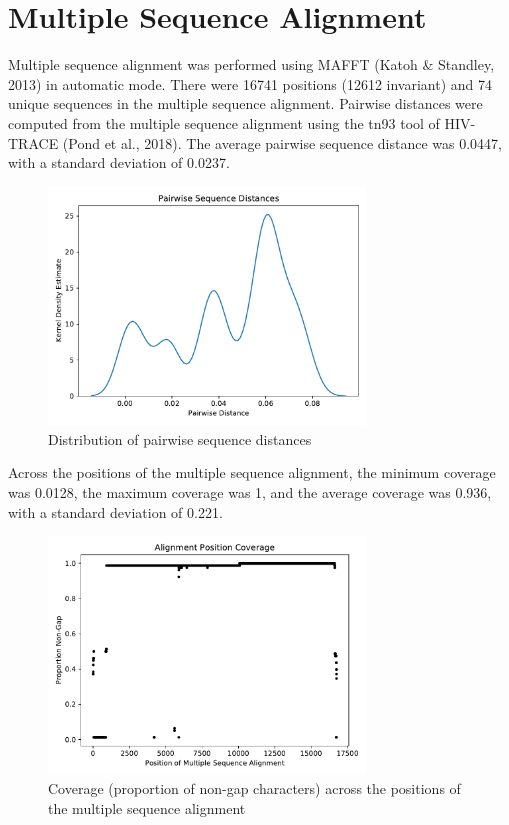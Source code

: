 \documentclass{article}
\begin{document}
\section{Multiple Sequence Alignment}
Multiple sequence alignment was performed using MAFFT (Katoh \& Standley, 2013) in automatic mode. There were 16741 positions (12612 invariant) and 74 unique sequences in the multiple sequence alignment. Pairwise distances were computed from the multiple sequence alignment using the tn93 tool of HIV-TRACE (Pond et al., 2018). The average pairwise sequence distance was 0.0447, with a standard deviation of 0.0237.

\begin{figure}[h]
\centering
\includegraphics[width=0.75\textwidth,keepaspectratio]{./figs/pairwise_distances_sequences.pdf}
\caption{Distribution of pairwise sequence distances}
\end{figure}

Across the positions of the multiple sequence alignment, the minimum coverage was 0.0128, the maximum coverage was 1, and the average coverage was 0.936, with a standard deviation of 0.221.

\begin{figure}[h]
\centering
\includegraphics[width=0.75\textwidth,keepaspectratio]{./figs/alignment_coverage.pdf}
\caption{Coverage (proportion of non-gap characters) across the positions of the multiple sequence alignment}
\end{figure}
\end{document}
